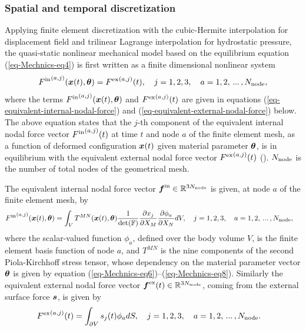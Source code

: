 \subsubsection*{Spatial and temporal discretization}
Applying finite element discretization with the cubic-Hermite interpolation for displacement field and trilinear Lagrange interpolation for hydrostatic pressure, the quasi-static nonlinear mechanical model based on the equilibrium equation (\ref{eq-Mechnics-eq4}) is first written as a finite dimensional nonlinear system
\begin{align}
{F^\textnormal{in}}^{(a,j)}(\vect{x}(t),\vect{\theta})= {F^\textnormal{ex}}^{(a,j)}(t), \quad j=1,2,3, \quad a=1,2,\,...\,,N_\textnormal{node},\label{eq-force-quilibrium}
\end{align}
where the terms ${F^\textnormal{in}}^{(a,j)}(\vect{x}(t),\vect{\theta})$  and ${F^\textnormal{ex}}^{(a,j)}(t)$ are given in equations (\ref{eq-equivalent-internal-nodal-force}) and (\ref{eq-equivalent-external-nodal-force}) below. The above equation states that the $j$-th component of the equivalent internal nodal force vector ${F^\textnormal{in}}^{(a,j)}(t)$  at time $t$ and node $a$ of the finite element mesh, as a function of deformed configuration $\vect{x}(t)$ given material parameter $\vect{\theta}$,  is in equilibrium with the equivalent external nodal force vector ${F^\textnormal{ex}}^{(a,j)}(t)$ (\citealt{Bonet1997Nonlinear}). $N_\textnormal{node}$ is the number of total nodes of the geometrical mesh.

The equivalent internal nodal force vector $\vect{F}^\textnormal{in} \in \Real^{3N_\textnormal{node}}$ is given, at node $a$ of the finite element mesh, by
\begin{align}
{F^\textnormal{in}}^{(a,j)}(\vect{x}(t),\vect{\theta})&= \int_{V} T^{MN}(\vect{x}(t),\vect{\theta}) \frac{1}{\det(\tens{F})} \pdpd{x_j}{X_M} \pdpd{\phi_a}{X_N}  dV,  \quad j=1,2,3,\quad a=1,2,\,...\,,N_\textnormal{node}, \label{eq-equivalent-internal-nodal-force}
\end{align}
where the scalar-valued function $\phi_a$, defined over the body volume $V$, is the finite element basis function of node $a$, and $T^{MN}$ is the nine components of the second Piola-Kirchhoff stress tensor, whose dependency on the material parameter vector $\vect{\theta}$ is given by equation (\ref{eq-Mechnics-eq6})--(\ref{eq-Mechnics-eq8}). Similarly the equivalent external nodal force vector $\vect{F}^\textnormal{ex}(t) \in \Real^{3N_\textnormal{node}}$, coming from the external surface force $\vect{s}$, is given by
\begin{align}
{F^{\textnormal{ex}}}^{(a,j)}(t) &= \int_{\partial V} s_j(t) \phi_a  dS, \quad j=1,2,3, \quad a=1,2,\,...\,,N_\textnormal{node}.
\label{eq-equivalent-external-nodal-force}
\end{align}

